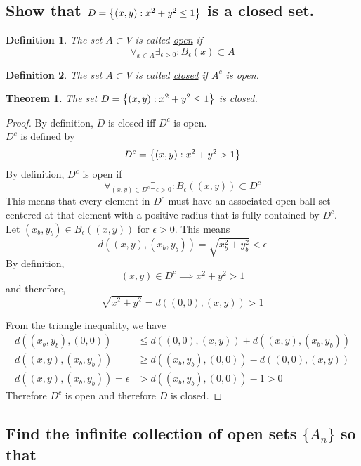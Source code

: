 \documentclass[]{article}
\newtheorem{definition}{Definition}
\newtheorem{theorem}{Theorem}
\begin{document}
\subsection{Show that $D = \qty{(x,y) : x^2 + y^2 \leq 1}$ is a closed set.}
\begin{definition}
    The set $A \subset V$ is called \underline{open} if 
    $$\forall_{x\in A} \exists_{\epsilon>0} : B_\epsilon(x)\subset A$$
\end{definition}
\begin{definition}
    The set $A \subset V$ is called \underline{closed} if $A^c$ is open.
\end{definition}
\begin{theorem}
    The set $D = \qty{(x,y) : x^2 + y^2 \leq 1}$ is closed.
\end{theorem}
\begin{proof}
    By definition, $D$ is closed iff $D^c$ is open.\\
    $D^c$ is defined by
    $$D^c = \qty{(x,y) : x^2 + y^2 > 1}$$
    By definition, $D^c$ is open if
    $$\forall_{(x,y) \in D^c} \exists_{\epsilon>0}: B_\epsilon ((x,y)) \subset D^c$$
    This means that every element in $D^c$ must have an associated open ball set centered 
    at that element with a positive radius that is fully contained by $D^c$.\\
    Let $(x_b,y_b) \in B_\epsilon ((x,y))$ for $\epsilon>0$.
    This means
    $$d((x,y),(x_b,y_b)) = \sqrt{x_b^2 + y_b^2} < \epsilon$$
    By definition,
    $$(x,y) \in D^c \implies x^2 + y^2 > 1$$
    and therefore,
    $$\sqrt{x^2 + y^2} = d((0,0),(x,y)) > 1$$

    From the triangle inequality, we have
    \begin{align*}
        d((x_b,y_b),(0,0)) &\leq d((0,0),(x,y)) + d((x,y),(x_b,y_b))\\
        d((x,y),(x_b,y_b)) &\geq d((x_b,y_b),(0,0)) - d((0,0),(x,y))\\
        d((x,y),(x_b,y_b)) = \epsilon &> d((x_b,y_b),(0,0)) - 1 > 0
    \end{align*}
    Therefore $D^c$ is open and therefore $D$ is closed.
\end{proof}

\newpage
\subsection{Find the infinite collection of open sets 
$\{A_n\}$ so that}%
\end{document}
